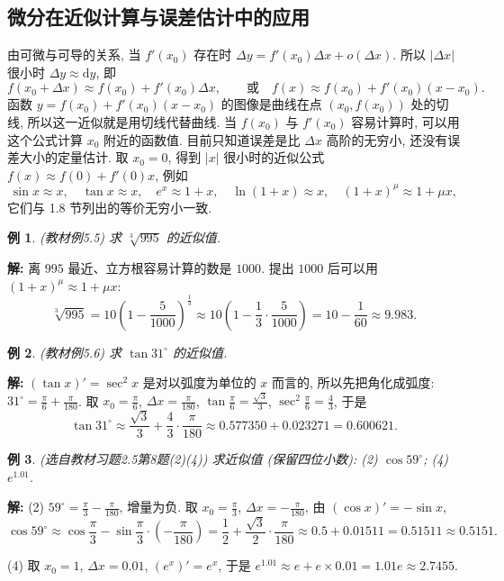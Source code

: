 \documentclass[UTF8,openany]{ctexbook}
\theoremstyle{chinesetextbook}
\newtheorem{example}{例}[section]
\newenvironment{cnsolution}{\par\indent\textbf{解:} \ignorespaces}{\par}
\newcommand{\dd}{\mathrm d}
\begin{document}
\subsection{微分在近似计算与误差估计中的应用}
由可微与可导的关系, 当 $f'(x_0)$ 存在时 $\Delta y=f'(x_0)\Delta x+o(\Delta x)$. 所以 $|\Delta x|$ 很小时 $\Delta y\approx\dd y$, 即
\[
f(x_0+\Delta x)\approx f(x_0)+f'(x_0)\Delta x,\qquad\text{或}\quad f(x)\approx f(x_0)+f'(x_0)(x-x_0).
\]
函数 $y=f(x_0)+f'(x_0)(x-x_0)$ 的图像是曲线在点 $(x_0,f(x_0))$ 处的切线, 所以这一近似就是用切线代替曲线. 当 $f(x_0)$ 与 $f'(x_0)$ 容易计算时, 可以用这个公式计算 $x_0$ 附近的函数值. 目前只知道误差是比 $\Delta x$ 高阶的无穷小, 还没有误差大小的定量估计. 取 $x_0=0$, 得到 $|x|$ 很小时的近似公式 $f(x)\approx f(0)+f'(0)x$, 例如
\[
\sin x\approx x,\quad\tan x\approx x,\quad e^x\approx1+x,\quad\ln(1+x)\approx x,\quad(1+x)^\mu\approx1+\mu x,
\]
它们与 1.8 节列出的等价无穷小一致.
\begin{example}\label{ex:c2-5-5}
\textnormal{(教材例5.5)} 求 $\sqrt[3]{995}$ 的近似值.
\end{example}
\begin{cnsolution}
离 $995$ 最近、立方根容易计算的数是 $1000$. 提出 $1000$ 后可以用 $(1+x)^\mu\approx1+\mu x$:
\[
\sqrt[3]{995}=10\left(1-\frac5{1000}\right)^{\frac13}\approx10\left(1-\frac13\cdot\frac5{1000}\right)=10-\frac1{60}\approx9.983.
\]
\end{cnsolution}
\begin{example}\label{ex:c2-5-6}
\textnormal{(教材例5.6)} 求 $\tan31^\circ$ 的近似值.
\end{example}
\begin{cnsolution}
$(\tan x)'=\sec^2x$ 是对以弧度为单位的 $x$ 而言的, 所以先把角化成弧度: $\displaystyle31^\circ=\frac\pi6+\frac\pi{180}$. 取 $\displaystyle x_0=\frac\pi6$, $\displaystyle\Delta x=\frac\pi{180}$, $\displaystyle\tan\frac\pi6=\frac{\sqrt3}3$, $\displaystyle\sec^2\frac\pi6=\frac43$, 于是
\[
\tan31^\circ\approx\frac{\sqrt3}3+\frac43\cdot\frac\pi{180}\approx0.577350+0.023271=0.600621.
\]
\end{cnsolution}
\begin{example}\label{ex:c2-h5-8}
\textnormal{(选自教材习题2.5第8题(2)(4))} 求近似值 (保留四位小数): (2) $\cos59^\circ$; (4) $e^{1.01}$.
\end{example}
\begin{cnsolution}
(2) $\displaystyle59^\circ=\frac\pi3-\frac\pi{180}$, 增量为负. 取 $\displaystyle x_0=\frac\pi3$, $\displaystyle\Delta x=-\frac\pi{180}$, 由 $(\cos x)'=-\sin x$,
\[
\cos59^\circ\approx\cos\frac\pi3-\sin\frac\pi3\cdot\left(-\frac\pi{180}\right)=\frac12+\frac{\sqrt3}2\cdot\frac\pi{180}\approx0.5+0.01511=0.51511\approx0.5151.
\]

(4) 取 $x_0=1$, $\Delta x=0.01$, $(e^x)'=e^x$, 于是 $e^{1.01}\approx e+e\times0.01=1.01e\approx2.7455$.
\end{cnsolution}
\end{document}
